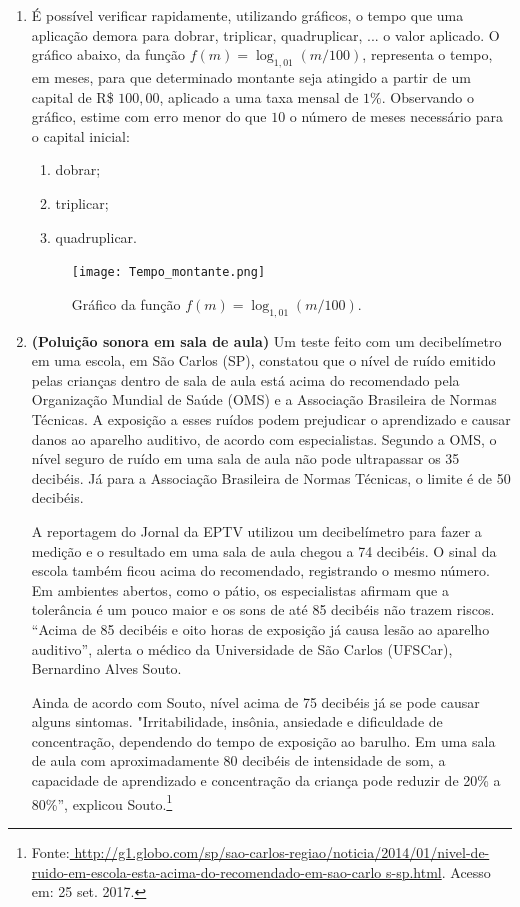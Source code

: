 \begin{enumerate}

\item É possível verificar rapidamente, utilizando gráficos, o tempo que uma aplicação demora para dobrar, triplicar, quadruplicar, ... o valor aplicado. O gráfico abaixo, da função $f(m)=\log_{1{,}01}(m/100)$, representa o tempo, em meses, para que determinado montante seja atingido a partir de um capital de R\$ $100{,}00$, aplicado a uma taxa mensal de $1\%$.  Observando o gráfico, estime com erro menor do que $10$ o número de meses necessário para o capital inicial:
\begin{enumerate}
\item dobrar;
\item triplicar;
\item quadruplicar.
\end{enumerate}

\begin{figure}[H]
\centering

\texttt{[image: Tempo\_montante.png]}
\caption{Gráfico da função $f(m)=\log_{1{,}01} (m/100)$.}
\label{EstimaGraf}
\end{figure}

\item {}\label{poluicaoSonora}

\textbf{(Poluição sonora em sala de aula)} Um teste feito com um decibelímetro em uma escola, em São Carlos (SP), 
constatou que o nível de ruído emitido pelas crianças dentro de sala de aula está acima do recomendado pela Organização 
Mundial de Saúde  (OMS) e a Associação Brasileira de Normas Técnicas. A exposição a esses ruídos podem prejudicar o 
aprendizado e causar danos ao aparelho auditivo, de acordo com especialistas.
Segundo a OMS, o nível seguro de ruído em uma sala de aula não pode ultrapassar os 35 decibéis. Já para a Associação Brasileira de Normas Técnicas, o limite é de 50 decibéis.

A reportagem do Jornal da EPTV utilizou um decibelímetro para fazer a medição e o resultado em uma sala de aula chegou a 74 decibéis. O sinal da escola também ficou acima do recomendado, registrando o mesmo número. Em ambientes abertos, como o pátio, os especialistas afirmam que a tolerância é um pouco maior e os sons de até 85 decibéis não trazem riscos. “Acima de 85 decibéis e oito horas de exposição já causa lesão ao aparelho auditivo”, alerta 
o médico da Universidade de São Carlos (UFSCar), Bernardino Alves Souto.

Ainda de acordo com Souto, nível acima de 75 decibéis já se pode causar alguns sintomas. "Irritabilidade, 
insônia, 
ansiedade e dificuldade de concentração, dependendo do tempo de exposição ao barulho. Em uma sala de aula com 
aproximadamente 80 decibéis de intensidade de som, a capacidade de aprendizado e concentração da criança pode reduzir de 
20{\%} a 80{\%}”, explicou 
Souto.\footnote{Fonte:\url{
http://g1.globo.com/sp/sao-carlos-regiao/noticia/2014/01/nivel-de-ruido-em-escola-esta-acima-do-recomendado-em-sao-carlo
s-sp.html}. Acesso em: 25 set. 2017.}


\end{enumerate}
